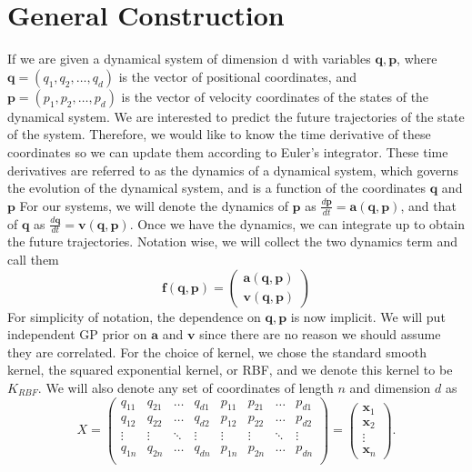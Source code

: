 \documentclass{statsmsc}
\begin{document}
\section{General Construction}
If we are given a dynamical system of dimension d with variables $\mathbf{q}, \mathbf{p}$, where $\mathbf{q} = (q_1, q_2,\dots,q_d)$ is the vector of positional coordinates, and $\mathbf{p}=(p_1, p_2, \dots, p_d)$ is the vector of velocity coordinates of the states of the dynamical system.
We are interested to predict the future trajectories of the state of the system.
Therefore, we would like to know the time derivative of these coordinates so we can update them according to Euler's integrator. 
These time derivatives are referred to as the dynamics of a dynamical system, which governs the evolution of the dynamical system, and is a function of the coordinates $\mathbf{q}$ and $\mathbf{p}$ 
For our systems, we will denote the dynamics of $\mathbf{p}$ as $\frac{d\mathbf{p}}{dt}=\mathbf{a}(\mathbf{q}, \mathbf{p})$, and that of $\mathbf{q}$ as $\frac{d\mathbf{q}}{dt}=\mathbf{v}(\mathbf{q}, \mathbf{p})$.
Once we have the dynamics, we can integrate up to obtain the future trajectories. 
Notation wise, we will collect the two dynamics term and call them $$\mathbf{f(\mathbf{q}, \mathbf{p})}=\begin{pmatrix}
    \mathbf{a(\mathbf{q}, \mathbf{p})}\\\mathbf{v(\mathbf{q}, \mathbf{p})}
\end{pmatrix}$$
For simplicity of notation, the dependence on $\mathbf{q}, \mathbf{p}$ is now implicit. 
We will put independent GP prior on $\mathbf{a}$ and $\mathbf{v}$ since there are no reason we should assume they are correlated. 
For the choice of kernel, we chose the standard smooth kernel, the squared exponential kernel, or RBF, and we denote this kernel to be $K_{RBF}$. 
We will also denote any set of coordinates of length $n$ and dimension $d$ as $$X=\begin{pmatrix}
    q_{11}& q_{21} &\dots& q_{d1} & p_{11} & p_{21} & \dots & p_{d1} \\
    q_{12}& q_{22} &\dots& q_{d2} & p_{12} & p_{22} & \dots & p_{d2} \\
    \vdots &\vdots &\ddots &\vdots &\vdots &\vdots &\ddots &\vdots \\
    q_{1n}& q_{2n} &\dots& q_{dn} & p_{1n} & p_{2n} & \dots & p_{dn} \\
\end{pmatrix}=\begin{pmatrix}
    \mathbf{x}_1\\\mathbf{x}_2\\\vdots\\\mathbf{x}_n
\end{pmatrix}.$$
\end{document}
